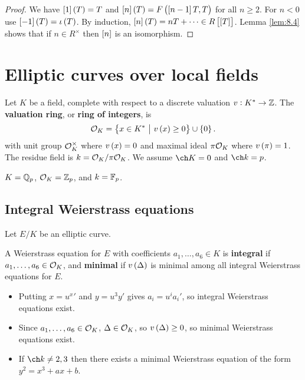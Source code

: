 \begin{proof}
We have $ \sbr{1}\br{T} = T $ and $ \sbr{n}\br{T} = F\br{\sbr{n - 1}T, T} $ for all $ n \ge 2 $. For $ n < 0 $ use $ \sbr{-1}\br{T} = \iota\br{T} $. By induction, $ \sbr{n}\br{T} = nT + \dots \in R\sbr{\sbr{T}} $. Lemma \ref{lem:8.4} shows that if $ n \in R^\times $ then $ \sbr{n} $ is an isomorphism.
\end{proof}

\pagebreak

\section{Elliptic curves over local fields}

Let $ K $ be a field, complete with respect to a discrete valuation $ v : K^* \to \mathbb{Z} $. The \textbf{valuation ring}, or \textbf{ring of integers}, is
$$ \OOO_K = \cbr{x \in K^* \st v\br{x} \ge 0} \cup \cbr{0}. $$
with unit group $ \mathcal{O}_K^\times $ where $ v\br{x} = 0 $ and maximal ideal $ \pi\mathcal{O}_K $ where $ v\br{\pi} = 1 $. The residue field is $ k = \mathcal{O}_K / \pi\mathcal{O}_K $. We assume $ \ch K = 0 $ and $ \ch k = p $.

\begin{example*}
$ K = \mathbb{Q}_p $, $ \mathcal{O}_K = \mathbb{Z}_p $, and $ k = \mathbb{F}_p $.
\end{example*}

\subsection{Integral Weierstrass equations}

Let $ E / K $ be an elliptic curve.

\begin{definition*}
A Weierstrass equation for $ E $ with coefficients $ a_1, \dots, a_6 \in K $ is \textbf{integral} if $ a_1, \dots, a_6 \in \mathcal{O}_K $, and \textbf{minimal} if $ v\br{\Delta} $ is minimal among all integral Weierstrass equations for $ E $.
\end{definition*}

\begin{remark*}
\hfill
\begin{itemize}
\item Putting $ x = u^x' $ and $ y = u^3y' $ gives $ a_i = u^ia_i' $, so integral Weierstrass equations exist.
\item Since $ a_1, \dots, a_6 \in \mathcal{O}_K $, $ \Delta \in \mathcal{O}_K $, so $ v\br{\Delta} \ge 0 $, so minimal Weierstrass equations exist.
\item If $ \ch k \ne 2, 3 $ then there exists a minimal Weierstrass equation of the form $ y^2 = x^3 + ax + b $.
\end{itemize}
\end{remark*}

